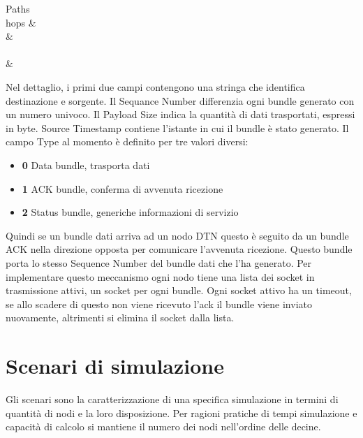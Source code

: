 \documentclass[12pt,a4paper,oneside]{book}
\begin{document}
\begin{itemize}
\begin{bytefield}[bitwidth=0.5em]{64}
				\begin{rightwordgroup}{Paths \\ hops}
					 &  \\
					 &  \\
					 \\[1ex]
					 & 
				\end{rightwordgroup}
				
			\end{bytefield}
			\vspace{25pt}
			
			Nel dettaglio, i primi due campi contengono una stringa che identifica destinazione e sorgente. Il Sequance Number differenzia ogni bundle generato con un numero univoco. Il Payload Size indica la quantità di dati trasportati, espressi in byte. Source Timestamp contiene l'istante in cui il bundle è stato generato. Il campo Type al momento è definito per tre valori diversi: 
			\begin{itemize}
				\item {\bf 0} Data bundle, trasporta dati
				\item {\bf 1} ACK bundle, conferma di avvenuta ricezione
				\item {\bf 2} Status bundle, generiche informazioni di servizio
			\end{itemize}
			
			Quindi se un bundle dati arriva ad un nodo DTN questo è seguito da un bundle ACK nella direzione opposta per comunicare l'avvenuta ricezione. Questo bundle porta lo stesso Sequence Number del bundle dati che l'ha generato. Per implementare questo meccanismo ogni nodo tiene una lista dei socket in trasmissione attivi, un socket per ogni bundle. Ogni socket attivo ha un timeout, se allo scadere di questo non viene ricevuto l'ack il bundle viene inviato nuovamente, altrimenti si elimina il socket dalla lista. 
				
		\end{itemize}
			
		\section{Scenari di simulazione}
		Gli scenari sono la caratterizzazione di una specifica simulazione in termini di quantità di nodi e la loro disposizione. Per ragioni pratiche di tempi simulazione e capacità di calcolo si mantiene il numero dei nodi nell'ordine delle decine.
		
\end{document}
